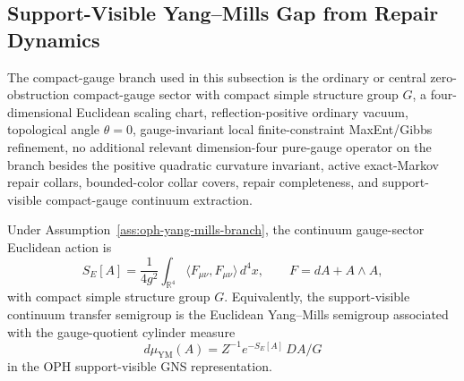 \subsection{Support-Visible Yang--Mills Gap from Repair Dynamics}
\label{app:yang-mills-repair-gap}

\begin{assumption}
\label{ass:oph-yang-mills-branch}
The compact-gauge branch used in this subsection is the ordinary or central zero-obstruction
compact-gauge sector with compact simple structure group \(G\), a four-dimensional Euclidean
scaling chart, reflection-positive ordinary vacuum, topological angle \(\theta=0\), gauge-invariant
local finite-constraint MaxEnt/Gibbs refinement, no additional relevant dimension-four pure-gauge
operator on the branch besides the positive quadratic curvature invariant, active exact-Markov
repair collars, bounded-color collar covers, repair completeness, and support-visible
compact-gauge continuum extraction.
\end{assumption}

\begin{theorem}
\label{thm:oph-4d-euclidean-yang-mills-form}
Under Assumption~\ref{ass:oph-yang-mills-branch}, the continuum gauge-sector Euclidean action is
\[
S_E[A]=\frac{1}{4g^2}\int_{\mathbb R^4}
\langle F_{\mu\nu},F_{\mu\nu}\rangle\,d^4x,
\qquad
F=dA+A\wedge A,
\]
with compact simple structure group \(G\). Equivalently, the support-visible continuum transfer
semigroup is the Euclidean Yang--Mills semigroup associated with the gauge-quotient cylinder
measure
\[
d\mu_{\mathrm{YM}}(A)=Z^{-1}e^{-S_E[A]}\,D A/G
\]
in the OPH support-visible GNS representation.
\end{theorem}

